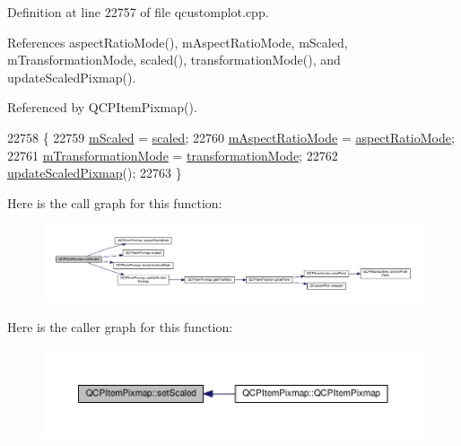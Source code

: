 Definition at line 22757 of file qcustomplot.\+cpp.



References aspect\+Ratio\+Mode(), m\+Aspect\+Ratio\+Mode, m\+Scaled, m\+Transformation\+Mode, scaled(), transformation\+Mode(), and update\+Scaled\+Pixmap().



Referenced by Q\+C\+P\+Item\+Pixmap().


\begin{DoxyCode}
22758 \{
22759   \hyperlink{class_q_c_p_item_pixmap_a8fe670a529cd46a9b8afd9fc1203bc3f}{mScaled} = \hyperlink{class_q_c_p_item_pixmap_a54026b89dff3c60376c2360f01b6fb83}{scaled};
22760   \hyperlink{class_q_c_p_item_pixmap_a8dc6b6c1e106ac523efae22d5fe55bab}{mAspectRatioMode} = \hyperlink{class_q_c_p_item_pixmap_ac5b95c097169e107a61eebbb7c77523c}{aspectRatioMode};
22761   \hyperlink{class_q_c_p_item_pixmap_ac9ecad3b9842363754e32eda2cf821bd}{mTransformationMode} = \hyperlink{class_q_c_p_item_pixmap_a1d4751a7b9588354fc8e726d891153f7}{transformationMode};
22762   \hyperlink{class_q_c_p_item_pixmap_a8bced3027b326b290726cd1979c7cfc6}{updateScaledPixmap}();
22763 \}
\end{DoxyCode}


Here is the call graph for this function\+:\nopagebreak
\begin{figure}[H]
\begin{center}
\leavevmode
\includegraphics[width=350pt]{class_q_c_p_item_pixmap_ab4d44529a1c6c8d37d0ea7560e042777_cgraph}
\end{center}
\end{figure}




Here is the caller graph for this function\+:\nopagebreak
\begin{figure}[H]
\begin{center}
\leavevmode
\includegraphics[width=350pt]{class_q_c_p_item_pixmap_ab4d44529a1c6c8d37d0ea7560e042777_icgraph}
\end{center}
\end{figure}


